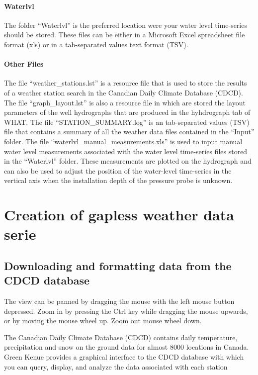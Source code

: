 \documentclass[12pt, letterpaper, fleqn]{report}
\begin{document}
\paragraph{Waterlvl} The folder ``Waterlvl'' is the preferred location were your water level time-series should be stored. These files can be  either in a Microsoft Excel spreadsheet file format (xls) or in a tab-separated values text format (TSV).

\paragraph{Other Files}The file ``weather\_stations.lst'' is a resource file that is used to store the results of a weather station search in the Canadian Daily Climate Database (CDCD). The file ``graph\_layout.lst'' is also a resource file in which are stored the layout parameters of the well hydrographs that are produced in the hyhdrograph tab of WHAT. The file ``STATION\_SUMMARY.log'' is an tab-separated values (TSV) file that contains a summary of all the weather data files contained in the ``Input'' folder. The file ``waterlvl\_manual\_measurements.xls'' is used to input manual water level measurements associated with the water level time-series files stored in the ``Waterlvl'' folder. These measurements are plotted on the hydrograph and can also be used to adjust the position of the water-level time-series in the vertical axis when the installation depth of the pressure probe is unknown.

\FloatBarrier

\section{Creation of gapless weather data serie}

\subsection{Downloading and formatting data from the CDCD database}

The view can be panned by dragging the mouse with the left mouse button depressed. Zoom in by pressing the Ctrl key while dragging the mouse upwards, or by moving the mouse wheel up. Zoom out mouse wheel down.

The Canadian Daily Climate Database (CDCD) contains daily temperature, precipitation and snow on the ground data for almost 8000 locations in Canada. Green Kenue provides a graphical interface to the CDCD database with which you can query, display, and analyze the data associated with each station
\end{document}
